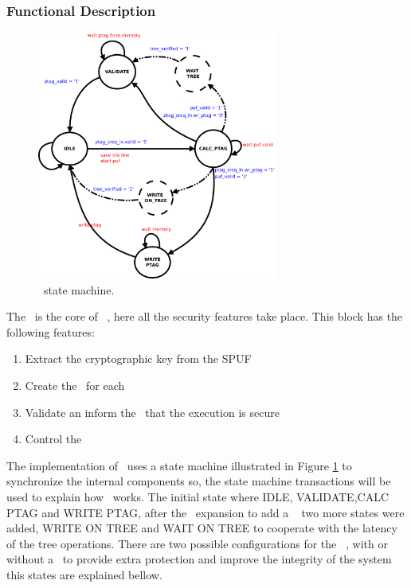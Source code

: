 \subsubsection{Functional Description}

\begin{figure}[!ht]
    \centering
    \includegraphics[width=0.70\textwidth]{figures/pdf/sec_engine_sm.pdf}
    \caption{\seceng~state  machine. }
    \label{fig:sesm}
\end{figure}

The \seceng~is the core of \cshia~, here all the security features take place. This block has the following features: 
\begin{enumerate}
    \item Extract the cryptographic key from the SPUF
    \item Create the \ptags~for each \sline
    \item Validate \ptags an inform the \handler~that the execution is secure
    \item Control the \ptagmem~
\end{enumerate}
The implementation of \seceng~uses a state machine illustrated in Figure \ref{fig:sesm} to synchronize the internal components so,  the  state machine transactions will be used to explain how \seceng~works. The initial state where IDLE, VALIDATE,CALC PTAG  and WRITE PTAG, after the \cshia~expansion to add a \mt~ two more states were added, WRITE ON TREE and WAIT ON TREE  to cooperate with the  latency of the tree  operations. There are two possible configurations for the \seceng~, with or without a \mt~to provide extra protection and improve the integrity of the system this states are explained bellow. 


